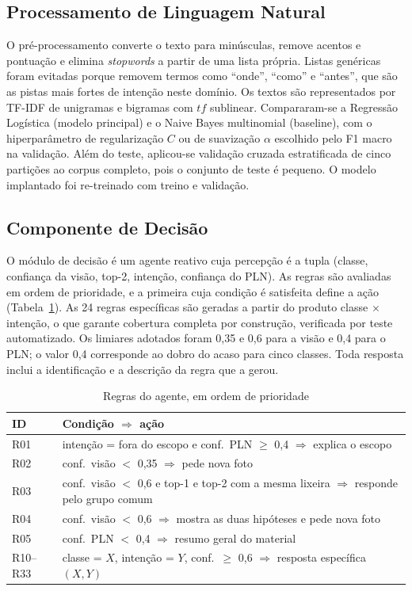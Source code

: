 \documentclass[conference]{IEEEtran}
\begin{document}
\subsection{Processamento de Linguagem Natural}
O pré-processamento converte o texto para minúsculas, remove acentos e pontuação e elimina \emph{stopwords} a partir de uma lista própria. Listas genéricas foram evitadas porque removem termos como ``onde'', ``como'' e ``antes'', que são as pistas mais fortes de intenção neste domínio. Os textos são representados por TF-IDF de unigramas e bigramas com $tf$ sublinear. Compararam-se a Regressão Logística (modelo principal) e o Naive Bayes multinomial (baseline), com o hiperparâmetro de regularização $C$ ou de suavização $\alpha$ escolhido pelo F1 macro na validação. Além do teste, aplicou-se validação cruzada estratificada de cinco partições ao corpus completo, pois o conjunto de teste é pequeno. O modelo implantado foi re-treinado com treino e validação.

\subsection{Componente de Decisão}
O módulo de decisão é um agente reativo cuja percepção é a tupla (classe, confiança da visão, top-2, intenção, confiança do PLN). As regras são avaliadas em ordem de prioridade, e a primeira cuja condição é satisfeita define a ação (Tabela~\ref{tab:regras}). As 24 regras específicas são geradas a partir do produto classe $\times$ intenção, o que garante cobertura completa por construção, verificada por teste automatizado. Os limiares adotados foram 0,35 e 0,6 para a visão e 0,4 para o PLN; o valor 0,4 corresponde ao dobro do acaso para cinco classes. Toda resposta inclui a identificação e a descrição da regra que a gerou.

\begin{table}[t]
\centering
\caption{Regras do agente, em ordem de prioridade}
\label{tab:regras}
\footnotesize
\begin{tabular}{@{}lp{6.4cm}@{}}
\toprule
ID & Condição $\Rightarrow$ ação \\
\midrule
R01 & intenção = fora do escopo e conf.\ PLN $\geq$ 0,4 $\Rightarrow$ explica o escopo \\
R02 & conf.\ visão $<$ 0,35 $\Rightarrow$ pede nova foto \\
R03 & conf.\ visão $<$ 0,6 e top-1 e top-2 com a mesma lixeira $\Rightarrow$ responde pelo grupo comum \\
R04 & conf.\ visão $<$ 0,6 $\Rightarrow$ mostra as duas hipóteses e pede nova foto \\
R05 & conf.\ PLN $<$ 0,4 $\Rightarrow$ resumo geral do material \\
R10--R33 & classe = $X$, intenção = $Y$, conf.\ $\geq$ 0,6 $\Rightarrow$ resposta específica $(X,Y)$ \\
\bottomrule
\end{tabular}
\end{table}
\end{document}
